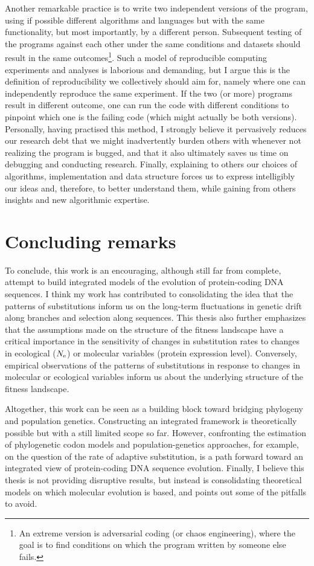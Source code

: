 Another remarkable practice is to write two independent versions of the program, using if possible different algorithms and languages but with the same functionality, but most importantly, by a different person.
Subsequent testing of the programs against each other under the same conditions and datasets should result in the same outcomes\footnote{An extreme version is adversarial coding (or chaos engineering), where the goal is to find conditions on which the program written by someone else fails.}.
Such a model of reproducible computing experiments and analyses is laborious and demanding, but I argue this is the definition of reproducibility we collectively should aim for, namely where one can independently reproduce the same experiment.
If the two (or more) programs result in different outcome, one can run the code with different conditions to pinpoint which one is the failing code (which might actually be both versions).
Personally, having practised this method, I strongly believe it pervasively reduces our research debt that we might inadvertently burden others with whenever not realizing the program is bugged, and that it also ultimately saves us time on debugging and conducting research.
Finally, explaining to others our choices of algorithms, implementation and data structure forces us to express intelligibly our ideas and, therefore, to better understand them, while gaining from others insights and new algorithmic expertise.


\section{Concluding remarks}
\label{sec:concluding-remarks}

To conclude, this work is an encouraging, although still far from complete, attempt to build integrated models of the evolution of protein-coding \acrshort{DNA} sequences.
I think my work has contributed to consolidating the idea that the patterns of \glspl{substitution} inform us on the long-term fluctuations in \gls{genetic drift} along branches and selection along sequences.
This thesis also further emphasizes that the assumptions made on the structure of the fitness landscape have a critical importance in the sensitivity of changes in \gls{substitution} rates to changes in ecological ($N_{\text{e}}$) or molecular variables (protein expression level).
Conversely, empirical observations of the patterns of \glspl{substitution} in response to changes in molecular or ecological variables inform us about the underlying structure of the fitness landscape.

Altogether, this work can be seen as a building block toward bridging phylogeny and population genetics.
Constructing an integrated framework is theoretically possible but with a still limited scope so far.
However, confronting the estimation of phylogenetic \gls{codon} models and population-genetics approaches, for example, on the question of the rate of adaptive \gls{substitution}, is a path forward toward an integrated view of protein-coding \acrshort{DNA} sequence evolution.
Finally, I believe this thesis is not providing disruptive results, but instead is consolidating theoretical models on which molecular evolution is based, and points out some of the pitfalls to avoid.
